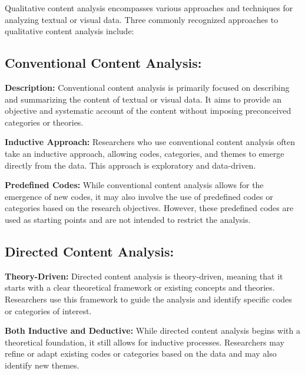 \documentclass[
  b5paper]{book}
\begin{document}
Qualitative content analysis encompasses various approaches and techniques for analyzing textual or visual data. Three commonly recognized approaches to qualitative content analysis include:

\hypertarget{conventional-content-analysis}{%
\subsection*{\texorpdfstring{\textbf{Conventional Content Analysis:}}{Conventional Content Analysis:}}\label{conventional-content-analysis}}

\textbf{Description:} Conventional content analysis is primarily focused on describing and summarizing the content of textual or visual data. It aims to provide an objective and systematic account of the content without imposing preconceived categories or theories.

\textbf{Inductive Approach:} Researchers who use conventional content analysis often take an inductive approach, allowing codes, categories, and themes to emerge directly from the data. This approach is exploratory and data-driven.

\textbf{Predefined Codes:} While conventional content analysis allows for the emergence of new codes, it may also involve the use of predefined codes or categories based on the research objectives. However, these predefined codes are used as starting points and are not intended to restrict the analysis.

\hypertarget{directed-content-analysis}{%
\subsection*{\texorpdfstring{\textbf{Directed Content Analysis:}}{Directed Content Analysis:}}\label{directed-content-analysis}}

\textbf{Theory-Driven:} Directed content analysis is theory-driven, meaning that it starts with a clear theoretical framework or existing concepts and theories. Researchers use this framework to guide the analysis and identify specific codes or categories of interest.

\textbf{Both Inductive and Deductive:} While directed content analysis begins with a theoretical foundation, it still allows for inductive processes. Researchers may refine or adapt existing codes or categories based on the data and may also identify new themes.
\end{document}
